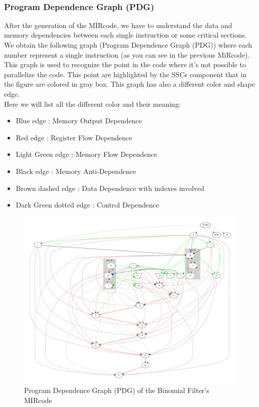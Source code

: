 {\begin{tabular}{l l l}
\end{tabular}\\
\subsubsection{Program Dependence Graph (PDG)}
After the generation of the MIRcode, we have to understand the data and memory dependencies between each single instruction or some critical sections.
We obtain the following graph (Program Dependence Graph (PDG)) where each number represent a single instruction (as you can see in the previous MiRcode).\\

 This graph is used to recognize the point in the code where it's not possible to parallelize the code. This point are highlighted by the SSCs component that in the figure are colored in gray box. This graph has also a different color and shape edge.\\
  Here we will list all the different color and their meaning: 
  \begin{itemize}
   \item Blue edge : Memory Output Dependence
   \item Red edge : Register Flow Dependence 
   \item Light Green edge : Memory Flow Dependence  
   \item Black edge : Memory Anti-Dependence
   \item Brown dashed edge : Data Dependence with indexes involved 
   \item Dark Green dotted edge : Control Dependence 
  \end{itemize}
  \begin{figure}[h!]
  	\centering
  	\includegraphics[width=\textwidth]{imm/tessa/PDGscc.pdf} 	\caption{Program Dependence Graph (PDG) of the Binomial Filter's MIRcode
  	} 
  	\label{pdg}
  \end{figure}
  \clearpage
}
